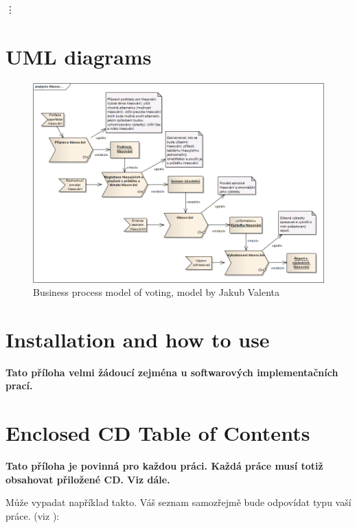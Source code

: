 \documentclass[11pt,twoside,a4paper]{book}
\begin{document}
\begin{description}
\item
\end{description}
\vdots

\chapter{UML diagrams}
\begin{figure}[h]
\begin{center}
\includegraphics[width=14cm]{figures/VotingCZECH}
\caption{Business process model of voting, model by Jakub Valenta}
\label{fig:businessMOD}
\end{center}
\end{figure}

\chapter{Installation and how to use}
\textbf{\large Tato příloha velmi žádoucí zejména u softwarových implementačních prací.}

\chapter{Enclosed CD Table of Contents}
\textbf{\large Tato příloha je povinná pro každou práci. Každá práce musí totiž obsahovat přiložené CD. Viz dále.}

Může vypadat například takto. Váš seznam samozřejmě bude odpovídat typu vaší práce. (viz \cite{infodp}):
\end{document}
